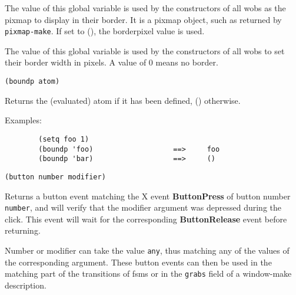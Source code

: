         

The value of this global variable is used by the constructors of all wobs as
the pixmap to display in their border. It is a pixmap object, such as
returned by \verb"pixmap-make". If set to (), the borderpixel value is used.

        

The value of this global variable is used by the constructors of all wobs to
set their border width in pixels. A value of 0 means no border.

        
{\usagefont\begin{verbatim}
(boundp atom)
\end{verbatim}}\usageupspace

Returns the (evaluated) atom if it has been defined, () otherwise.

{Examples:\exemplefont\upspace\begin{verbatim}
        (setq foo 1)
        (boundp 'foo)                   ==>     foo
        (boundp 'bar)                   ==>     ()
\end{verbatim}}

        
{\usagefont\begin{verbatim}
(button number modifier)
\end{verbatim}}\usageupspace

Returns a button event matching the X event {\bf ButtonPress} of button
number \verb"number", and will verify that
the modifier argument was depressed during the click. This event will wait
for the corresponding {\bf ButtonRelease} event before returning.  

Number or modifier can take the value \verb"any", thus matching any of the
values of the corresponding argument.  These button events can then be used
in the matching part of the transitions of fsms or in the \verb"grabs"
field of a window-make description.


